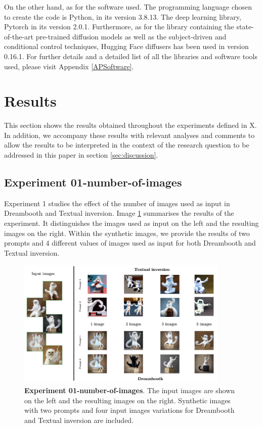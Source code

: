 On the other hand, as for the software used. The programming language chosen to create the code is Python, in its version 3.8.13. The deep learning library, Pytorch in its version 2.0.1. Furthermore, as for the library containing the state-of-the-art pre-trained diffusion models as well as the subject-driven and conditional control techniques, Hugging Face diffusers has been used in version 0.16.1. For further details and a detailed list of all the libraries and software tools used, please visit Appendix \ref{APSoftware}.

\section{Results} \label{sec: results} 

This section shows the results obtained throughout the experiments defined in X. In addition, we accompany these results with relevant analyses and comments to allow the results to be interpreted in the context of the research question to be addressed in this paper in section \ref{sec:discussion}.

\subsection{Experiment 01-number-of-images} \label{sec: exp-01}

Experiment 1 studies the effect of the number of images used as input in Dreambooth and Textual inversion. Image \ref{fig:exp1} summarises the results of the experiment. It distinguishes the images used as input on the left and the resulting images on the right. Within the synthetic images, we provide the results of two prompts and 4 different values of images used as input for both Dreambooth and Textual inversion.   

\begin{figure}
    \centering
    \includegraphics[width=0.90\textwidth]{Pictures/exp1.png} 
    \caption{\textbf{Experiment 01-number-of-images}. The input images are shown on the left and the resulting images on the right. Synthetic images with two prompts and four input images variations for Dreambooth and Textual inversion are included.}
    \label{fig:exp1}
\end{figure}

